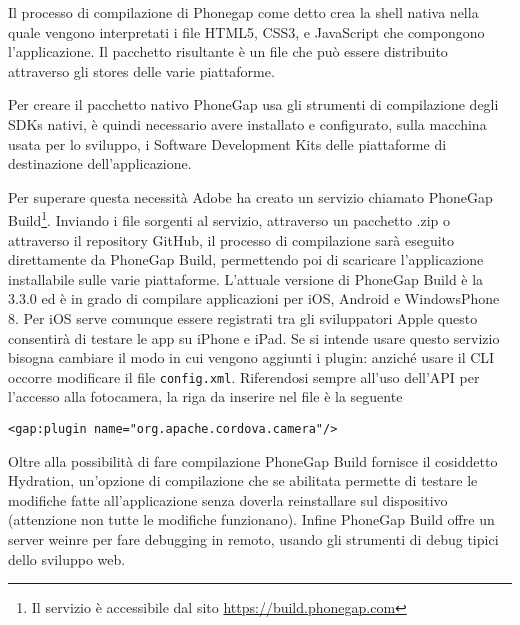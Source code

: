             Il processo di compilazione di Phonegap come detto
            crea la shell nativa nella quale vengono interpretati i file HTML5, CSS3, e
            JavaScript che compongono l'applicazione. Il pacchetto
            risultante è un file che può essere distribuito attraverso gli stores
            delle varie piattaforme.

            Per creare il pacchetto nativo PhoneGap usa gli strumenti di compilazione
            degli SDKs nativi, è quindi necessario avere installato e configurato,
            sulla macchina
            usata per lo sviluppo, i Software Development Kits delle piattaforme
            di destinazione dell'applicazione.

            Per superare questa necessità Adobe ha creato un servizio chiamato
            PhoneGap Build\footnote{Il servizio è accessibile dal sito
            \url{https://build.phonegap.com}}.
            Inviando i file sorgenti al servizio, attraverso un
            pacchetto .zip o attraverso il repository GitHub, il processo di
            compilazione sarà eseguito direttamente da PhoneGap Build, permettendo
            poi di scaricare l'applicazione installabile sulle varie piattaforme.
            L'attuale versione di PhoneGap Build è la 3.3.0 ed è in grado di compilare
            applicazioni per iOS, Android e WindowsPhone 8. Per iOS serve comunque
            essere registrati tra gli sviluppatori Apple questo consentirà di
            testare le app su iPhone e iPad.
            Se si intende usare questo servizio bisogna cambiare il modo in cui
            vengono aggiunti i plugin: anziché usare il CLI occorre modificare
            il file \verb|config.xml|. Riferendosi sempre all'uso dell'API per
            l'accesso alla fotocamera, la riga da inserire nel file è la seguente
    \begin{lstlisting}[]
  <gap:plugin name="org.apache.cordova.camera"/>
    \end{lstlisting}

            Oltre alla possibilità di fare compilazione PhoneGap Build fornisce
            il cosiddetto Hydration, un'opzione di compilazione che se abilitata
            permette di testare le modifiche fatte all'applicazione senza doverla
            reinstallare sul dispositivo (attenzione non tutte le modifiche
            funzionano). Infine PhoneGap Build offre un server weinre per fare
            debugging in remoto, usando gli strumenti di debug tipici dello
            sviluppo web.


